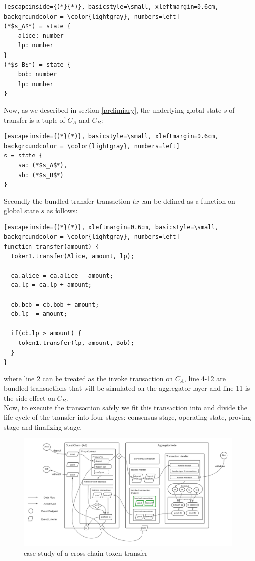 \documentclass[pageno]{jpaper}
\begin{document}
\begin{lstlisting}[escapeinside={(*}{*)}, basicstyle=\small, xleftmargin=0.6cm, backgroundcolor = \color{lightgray}, numbers=left]
(*$s_A$*) = state {
    alice: number
    lp: number
}
(*$s_B$*) = state {
    bob: number
    lp: number
}
\end{lstlisting}
Now, as we described in section \ref{prelimiary}, the underlying global state $s$ of transfer is a tuple of $C_A$ and $C_B$:
\begin{lstlisting}[escapeinside={(*}{*)}, basicstyle=\small, xleftmargin=0.6cm, backgroundcolor = \color{lightgray}, numbers=left]
s = state {
    sa: (*$s_A$*),
    sb: (*$s_B$*)
}
\end{lstlisting}
Secondly the bundled transfer transaction $tx$ can be defined as a function on global state $s$ as follows:
\begin{lstlisting}[escapeinside={(*}{*)}, xleftmargin=0.6cm, basicstyle=\small, backgroundcolor = \color{lightgray}, numbers=left]
function transfer(amount) {
  token1.transfer(Alice, amount, lp);
  
  ca.alice = ca.alice - amount;
  ca.lp = ca.lp + amount;
  
  cb.bob = cb.bob + amount;
  cb.lp -= amount;
  
  if(cb.lp > amount) {
    token1.transfer(lp, amount, Bob);
  }
}
\end{lstlisting}
where line 2 can be treated as the invoke transaction on $C_A$, line 4-12 are bundled transactions that will be simulated on the aggregator layer and line 11 is the side effect on $C_B$.\\
\newline
Now, to execute the transaction safely we fit this transaction into \dprotocol and divide the life cycle of the transfer into four stages: consensus stage, operating state, proving stage and finalizing stage.\\
\begin{figure}[!ht]
\caption{case study of a cross-chain token transfer}
\label{case-study}
\includegraphics[scale=0.6]{case-study}
\end{figure}
\end{document}
